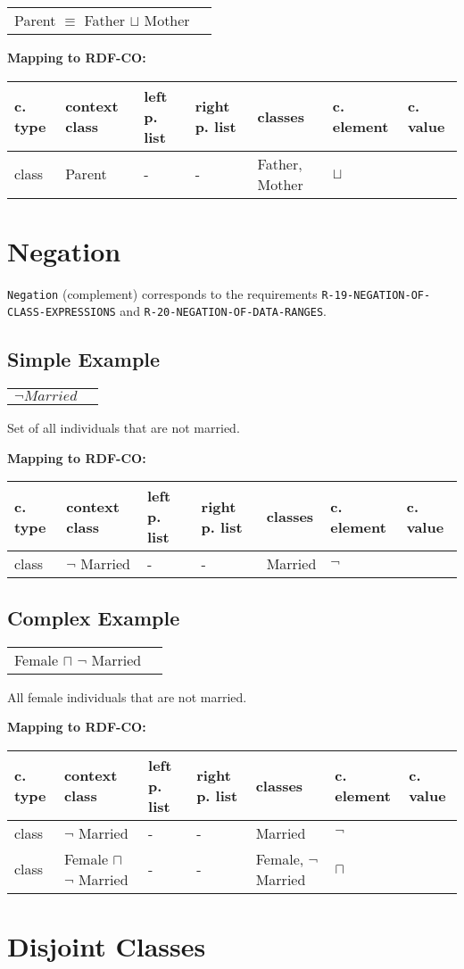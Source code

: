 \documentclass{llncs}
\newcommand{\ms}[1]{\texttt{#1}}
\newenvironment{gcotable}{
  \scriptsize
  \sffamily
  \vspace{0cm}
	\begin{center}
	\textbf{\vspace{0.4cm}Mapping to RDF-CO:} \\
  \begin{tabular}{l|l|l|l|l|l|l}
	\hline
  \textbf{c. type} & \textbf{context class} & \textbf{left p. list} & \textbf{right p. list} & \textbf{classes} & \textbf{c. element} & \textbf{c. value} \\
  \hline

}{
  \hline
  \end{tabular}
	\end{center}
}
\newenvironment{DL}{
  \vspace{0cm}
	\begin{center}
  \begin{tabular}{r l}

}{
  \end{tabular}
	\end{center}
}
\begin{document}
\begin{DL}
Parent $\equiv$ Father $\sqcup$ Mother
\end{DL}

\begin{gcotable}
class & Parent & - & - & Father, Mother & $\sqcup$ \\
\end{gcotable}

\section{Negation}

\ms{Negation} (complement) corresponds to the requirements \ms{R-19-NEGATION-OF-} \ms{CLASS-EXPRESSIONS} and \ms{R-20-NEGATION-OF-DATA-RANGES}.

\subsection{Simple Example}

\begin{DL}
$ \neg Married $ \\ 
\end{DL}

Set of all individuals that are not married.

\begin{gcotable}
class & $\neg$ Married & - & - & Married & $\neg$ \\
\end{gcotable}

\subsection{Complex Example}

\begin{DL}
Female $\sqcap$ $\neg$ Married \\
\end{DL}

All female individuals that are not married.

\begin{gcotable}
class & $\neg$ Married & - & - & Married & $\neg$ \\
class & Female $\sqcap$ $\neg$ Married & - & - & Female, $\neg$ Married & $\sqcap$ \\
\end{gcotable}

\section{Disjoint Classes}
\end{document}
